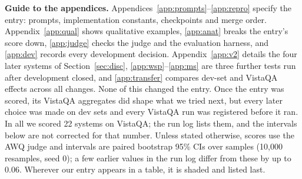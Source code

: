 \documentclass{article}
\begin{document}
\appendix
\noindent\textbf{Guide to the appendices.} Appendices~\ref{app:prompts}--\ref{app:repro} specify the entry: prompts,
implementation constants, checkpoints and merge order. Appendix~\ref{app:qual} shows qualitative examples, \ref{app:anat} breaks the
entry's score down, \ref{app:judge} checks the judge and the evaluation harness, and \ref{app:dev} records every development
decision. Appendix~\ref{app:v2} details the four later systems of Section~\ref{sec:disc}, \ref{app:wsp}--\ref{app:ms} are
three further tests run after development closed, and \ref{app:transfer} compares dev-set and VistaQA effects across all changes. None of this changed the entry. Once the entry was scored, its VistaQA aggregates
did shape what we tried next, but every later choice was made on dev sets and every VistaQA run was registered before it ran. In
all we scored 22 systems on VistaQA; the run log lists them, and the intervals below are not corrected for that number. Unless
stated otherwise, scores use the AWQ judge and intervals are paired bootstrap 95\% CIs over samples (10,000 resamples, seed 0);
a few earlier values in the run log differ from these by up to 0.06. Wherever our entry appears in a table, it is shaded and
listed last.
\end{document}
